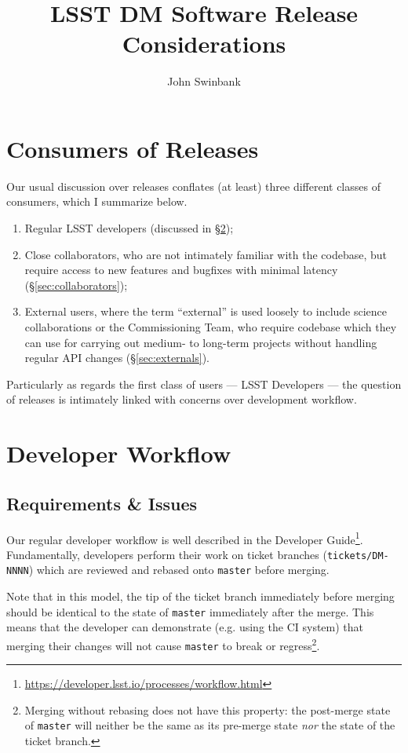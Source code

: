 \documentclass[DM,toc]{lsstdoc}
\title[DM Software Releases]{LSST DM Software Release Considerations}
\author{John Swinbank}
\begin{document}
\maketitle

\section{Consumers of Releases}

Our usual discussion over releases conflates (at least) three different
classes of consumers, which I summarize below.

\begin{enumerate}

\item{Regular LSST developers (discussed in \S\ref{sec:workflow});}

\item{Close collaborators, who are not intimately familiar with the codebase,
but require access to new features and bugfixes with minimal latency
(\S\ref{sec:collaborators});}

\item{External users, where the term ``external'' is used loosely to include
science collaborations or the Commissioning Team, who require codebase which
they can use for carrying out medium- to long-term projects without handling
regular API changes (\S\ref{sec:externals}).}

\end{enumerate}

Particularly as regards the first class of users --- LSST Developers --- the
question of releases is intimately linked with concerns over development
workflow.

\section{Developer Workflow}
\label{sec:workflow}

\subsection{Requirements \& Issues}

Our regular developer workflow is well described in the Developer
Guide\footnote{\url{https://developer.lsst.io/processes/workflow.html}}.
Fundamentally, developers perform their work on ticket branches
(\texttt{tickets/DM-NNNN}) which are reviewed and rebased onto \texttt{master}
before merging.

Note that in this model, the tip of the ticket branch immediately before
merging should be identical to the state of \texttt{master} immediately after
the merge. This means that the developer can demonstrate (e.g. using the CI
system) that merging their changes will not cause \texttt{master} to break or
regress\footnote{Merging without rebasing does not have this property: the
post-merge state of \texttt{master} will neither be the same as its pre-merge
state \textit{nor} the state of the ticket branch.}.
\end{document}
